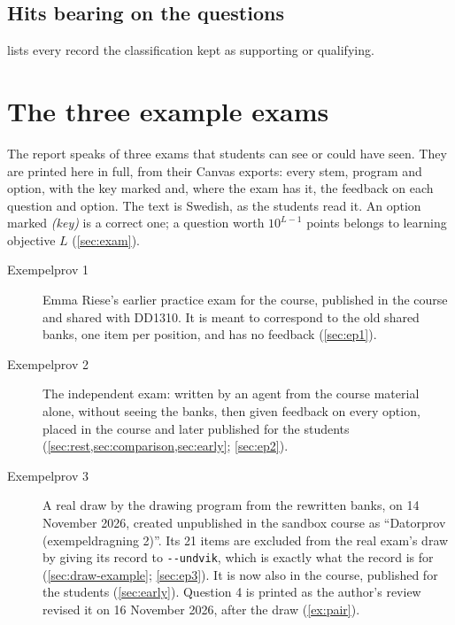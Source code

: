 \section{Hits bearing on the questions}
\label{sec:komplement-hits}

 lists every record the classification
kept as supporting or qualifying.



\chapter{The three example exams}
\label{app:exempelprov}

The report speaks of three exams that students can see or could have
seen.  They are printed here in full, from their Canvas exports: every
stem, program and option, with the key marked and, where the exam has it,
the feedback on each question and option.  The text is Swedish, as the
students read it.  An option marked \emph{(key)} is a correct one; a
question worth $10^{L-1}$ points belongs to learning objective $L$
(\cref{sec:exam}).

\begin{description}
  \item[Exempelprov 1] Emma Riese's earlier practice exam for the course,
    published in the course and shared with DD1310.  It is meant to
    correspond to the old shared banks, one item per position, and has no
    feedback (\cref{sec:ep1}).
  \item[Exempelprov 2] The independent exam: written by an agent from the
    course material alone, without seeing the banks, then given feedback
    on every option, placed in the course and later published for the
    students (\cref{sec:rest,sec:comparison,sec:early}; \cref{sec:ep2}).
  \item[Exempelprov 3] A real draw by the drawing program from the
    rewritten banks, on 14 November 2026, created unpublished in the
    sandbox course as \enquote{Datorprov (exempeldragning 2)}.  Its 21
    items are excluded from the real exam's draw by giving its record to
    \texttt{-{}-undvik}, which is exactly what the record is for
    (\cref{sec:draw-example}; \cref{sec:ep3}).  It is now also in the
    course, published for the students (\cref{sec:early}).  Question 4 is
    printed as the author's review
    revised it on 16 November 2026, after the draw (\cref{ex:pair}).
\end{description}

